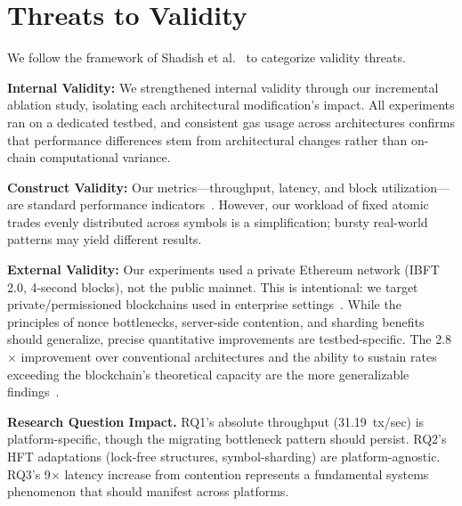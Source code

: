 \section{Threats to Validity}

\label{sec:threats}

We follow the framework of Shadish et al.~\cite{shadish2002experimental} to categorize validity threats.

\textbf{Internal Validity:} We strengthened internal validity through our incremental ablation study, isolating each architectural modification's impact. All experiments ran on a dedicated testbed, and consistent gas usage across architectures confirms that performance differences stem from architectural changes rather than on-chain computational variance.

\textbf{Construct Validity:} Our metrics—throughput, latency, and block utilization—are standard performance indicators~\cite{hennessy2017computer}. However, our workload of fixed atomic trades evenly distributed across symbols is a simplification; bursty real-world patterns may yield different results.

\textbf{External Validity:} Our experiments used a private Ethereum network (IBFT 2.0, 4-second blocks), not the public mainnet. This is intentional: we target private/permissioned blockchains used in enterprise settings~\cite{lewis2017blockchain,androulaki2018fabric}. While the principles of nonce bottlenecks, server-side contention, and sharding benefits should generalize, precise quantitative improvements are testbed-specific. The 2.8$\times$ improvement over conventional architectures and the ability to sustain rates exceeding the blockchain's theoretical capacity are the more generalizable findings~\cite{choffnes2010pitfalls}.

\textbf{Research Question Impact.} RQ1's absolute throughput (31.19~tx/sec) is platform-specific, though the migrating bottleneck pattern should persist. RQ2's HFT adaptations (lock-free structures, symbol-sharding) are platform-agnostic. RQ3's 9$\times$ latency increase from contention represents a fundamental systems phenomenon that should manifest across platforms.

